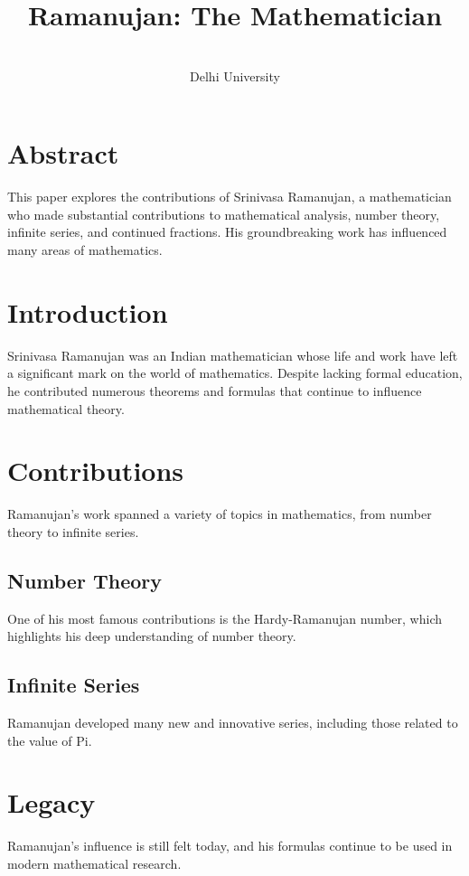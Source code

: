 \documentclass[a4paper,10pt]{article}
\begin{document}
\title{Ramanujan: The Mathematician}
\author{\\ Delhi University}
\date{}
\maketitle

\section*{Abstract}
This paper explores the contributions of Srinivasa Ramanujan, a mathematician who made substantial contributions to mathematical analysis, number theory, infinite series, and continued fractions. His groundbreaking work has influenced many areas of mathematics.

\tableofcontents
\vspace{10pt}

\section{Introduction}
Srinivasa Ramanujan was an Indian mathematician whose life and work have left a significant mark on the world of mathematics. Despite lacking formal education, he contributed numerous theorems and formulas that continue to influence mathematical theory.

\section{Contributions}
Ramanujan's work spanned a variety of topics in mathematics, from number theory to infinite series.

\subsection{Number Theory}
One of his most famous contributions is the Hardy-Ramanujan number, which highlights his deep understanding of number theory.

\subsection{Infinite Series}
Ramanujan developed many new and innovative series, including those related to the value of Pi.

\section{Legacy}
Ramanujan's influence is still felt today, and his formulas continue to be used in modern mathematical research.
\end{document}
